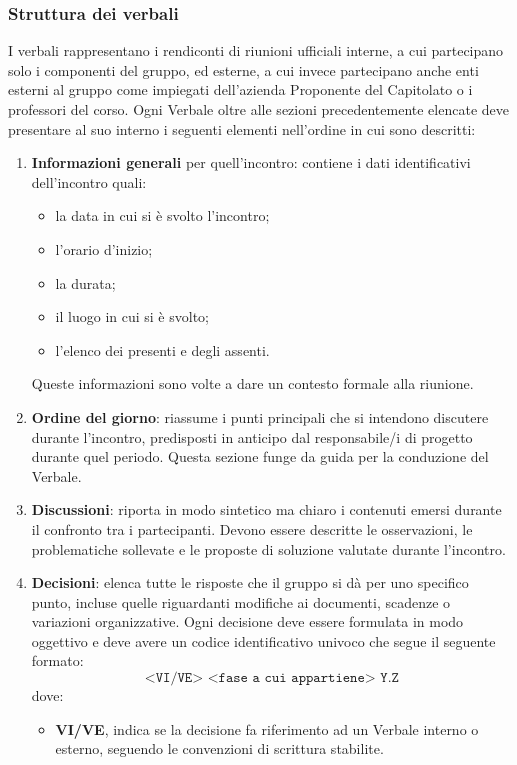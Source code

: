 \documentclass[a4paper,12pt]{article}
\begin{document}
\subsubsection*{Struttura dei verbali}
I verbali rappresentano i rendiconti di riunioni ufficiali interne, a cui partecipano solo i componenti del gruppo, ed esterne, a cui invece partecipano anche enti esterni al gruppo come impiegati dell'azienda Proponente del Capitolato o i professori del corso. Ogni Verbale oltre alle sezioni precedentemente elencate deve presentare al suo interno i seguenti elementi nell'ordine in cui sono descritti:
\begin{enumerate}
  \item \textbf{Informazioni generali} per quell'incontro: contiene i dati identificativi dell’incontro quali: 
  \begin{itemize}
      \item la data in cui si è svolto l'incontro;
      \item l'orario d'inizio;
      \item la durata;
      \item il luogo in cui si è svolto;
      \item l'elenco dei presenti e degli assenti.
  \end{itemize}
    Queste informazioni sono volte a dare un contesto formale alla riunione.
  \item \textbf{Ordine del giorno}: riassume i punti principali che si intendono discutere durante l’incontro, predisposti in anticipo dal responsabile/i di progetto durante quel periodo. Questa sezione funge da guida per la conduzione del Verbale.
  \item \textbf{Discussioni}: riporta in modo sintetico ma chiaro i contenuti emersi durante il confronto tra i partecipanti. Devono essere descritte le osservazioni, le problematiche sollevate e le proposte di soluzione valutate durante l’incontro.
  \item \textbf{Decisioni}: elenca tutte le risposte che il gruppo si dà per uno specifico punto, incluse quelle riguardanti modifiche ai documenti, scadenze o variazioni organizzative. Ogni decisione deve essere formulata in modo oggettivo e deve avere un codice identificativo univoco che segue il seguente formato:
  \[
\texttt{<VI/VE> <fase a cui appartiene> Y.Z}
\]
dove:
\begin{itemize}
    \item \textbf{VI/VE}, indica se la decisione fa riferimento ad un Verbale interno o esterno, seguendo le convenzioni di scrittura stabilite.

\end{itemize}
\end{enumerate}
\end{document}
